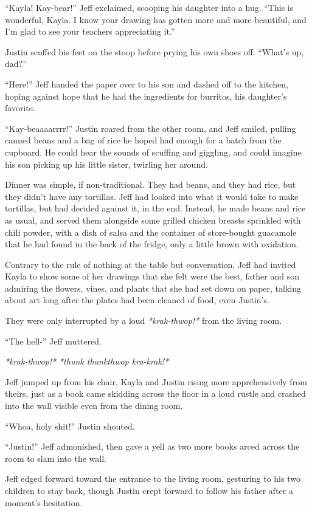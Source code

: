 ``Kayla!  Kay-bear!'' Jeff exclaimed, scooping his daughter into a hug.  ``This is wonderful, Kayla.  I know your drawing has gotten more and more beautiful, and I'm glad to see your teachers appreciating it.''

Justin scuffed his feet on the stoop before prying his own shoes off.  ``What's up, dad?''

``Here!'' Jeff handed the paper over to his son and dashed off to the kitchen, hoping against hope that he had the ingredients for burritos, his daughter's favorite.

``Kay-beaaaarrrr!'' Justin roared from the other room, and Jeff smiled, pulling canned beans and a bag of rice he hoped had enough for a batch from the cupboard.  He could hear the sounds of scuffing and giggling, and could imagine his son picking up his little sister, twirling her around.

Dinner was simple, if non-traditional.  They had beans, and they had rice, but they didn't have any tortillas.  Jeff had looked into what it would take to make tortillas, but had decided against it, in the end.  Instead, he made beans and rice as usual, and served them alongside some grilled chicken breasts sprinkled with chili powder, with a dish of salsa and the container of store-bought guacamole that he had found in the back of the fridge, only a little brown with oxidation.

Contrary to the rule of nothing at the table but conversation, Jeff had invited Kayla to show some of her drawings that she felt were the best, father and son admiring the flowers, vines, and plants that she had set down on paper, talking about art long after the plates had been cleaned of food, even Justin's.

They were only interrupted by a loud \textit{*krak-thwop!*} from the living room.

``The hell-'' Jeff muttered.

\textit{*krak-thwop!*}  \textit{*thunk thunkthwop kra-krak!*}

Jeff jumped up from his chair, Kayla and Justin rising more apprehensively from theirs, just as a book came skidding across the floor in a loud rustle and crashed into the wall visible even from the dining room.

``Whoa, holy shit!'' Justin shouted.

``Justin!'' Jeff admonished, then gave a yell as two more books arced across the room to slam into the wall.

Jeff edged forward toward the entrance to the living room, gesturing to his two children to stay back, though Justin crept forward to follow his father after a moment's hesitation.

